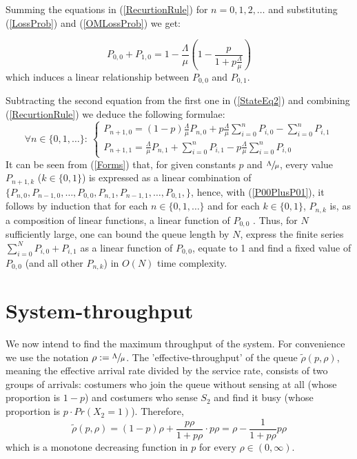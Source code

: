 \documentclass[11pt]{article}
\numberwithin{equation}{section}
\begin{document}
Summing the equations in (\ref{RecurtionRule}) for $n=0,1,2,\ldots$ and substituting (\ref{LossProb}) and (\ref{OMLossProb}) we get:

\begin{equation}
	P_{0,0} + P_{1,0} = 1- \frac{ \Lambda}{ \mu}\left(1- \frac{p}{1+p \frac{\Lambda}{\mu}} \right) \label{P00PlusP01}
\end{equation}
which induces a linear relationship between $P_{0,0}$ and $P_{0,1}$.

Subtracting the second equation from the first one in (\ref{StateEq2}) and combining (\ref{RecurtionRule}) we deduce the following formulae:
\begin{equation}
	\forall n \in \lbrace 0, 1, \ldots \rbrace: \
  	\begin{cases}
    	P_{n+1,0} = (1-p) \frac{\Lambda}{\mu} P_{n, 0} + p \frac{\Lambda}{\mu} \sum\limits_{i=0}^{n}P_{i,0} - \sum\limits_{i=0}^{n}P_{i,1}\\
   	 	P_{n+1,1} = \frac{\Lambda}{\mu} P_{n, 1} + \sum\limits_{i=0}^{n}P_{i,1} - p \frac{\Lambda}{\mu} \sum\limits_{i=0}^{n}P_{i,0}
  	\end{cases} \label{Forms}
\end{equation}
It can be seen from (\ref{Forms}) that, for given constants $p$ and $\sfrac{\Lambda}{\mu}$, every value $P_{n+1,k}$ ($k\in\lbrace0,1\rbrace$) is expressed as a linear combination of $\lbrace P_{n,0}, P_{n-1,0}, \ldots, P_{0,0}, P_{n,1}, P_{n-1,1}, \ldots, P_{0,1},  \rbrace$, hence, with (\ref{P00PlusP01}), it follows by induction that for each $n \in \lbrace 0, 1, \ldots \rbrace$ and for each $k \in \lbrace 0, 1 \rbrace$, $P_{n,k}$ is, as a composition of linear functions, a linear function of $P_{0,0}$ . Thus, for $N$ sufficiently large, one can bound the queue length by $N$, express the finite series $\sum_{i=0}^{N} P_{i,0}+P_{i,1}$ as a linear function of $P_{0,0}$, equate to 1 and find a fixed value of $P_{0,0}$ (and all other $P_{n,k}$) in $O(N)$ time complexity.
\newpage

\section{System-throughput}
We now intend to find the maximum throughput of the system. For convenience we use the notation $\rho:=\sfrac{\Lambda}{\mu}$. The 'effective-throughput' of the queue $\tilde{\rho}(p,\rho)$, meaning the effective arrival rate divided by the service rate, consists of two groups of arrivals: costumers who join the queue without sensing at all (whose proportion is $1-p$) and costumers who sense $S_{2}$ and find it busy (whose proportion is $p \cdot Pr(X_2=1)$). Therefore,
\begin{equation}
	\tilde{\rho}(p,\rho) = (1-p)\rho + \frac{p\rho}{1+p\rho}\cdot p\rho = \rho - \frac{1}{1+p\rho}p\rho \label{EffectiveRate}
\end{equation}
which is a monotone decreasing function in $p$ for every $\rho\in(0,\infty)$. 
\end{document}
